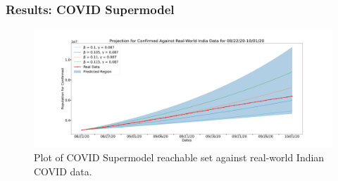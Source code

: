 \documentclass{beamer}
\begin{document}
\begin{frame}
  \frametitle{\textbf{Results:}  COVID Supermodel}
  \begin{figure}
    \centering
    \includegraphics[width=1.1\textwidth]{IndianRecoveredPlot}
    \caption{Plot of COVID Supermodel reachable set against real-world Indian COVID data.}
  \end{figure}
 \end{frame}
\end{document}

